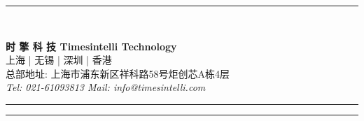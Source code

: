\makeatletter
{}



\renewcommand{\headrulewidth}{0pt}

{\color{myblue}\rule{30pt}{2.1cm}}
    \hspace{0.2cm}
    \begin{minipage}[b]{16.5cm}
    {\fontsize{36pt}{48pt}\textbf{\Target}}\\

    {\fontsize{28pt}{18pt}\textbf{\color{mygrayy}\@title}}
    \end{minipage}

\vspace{30em}


\begin{center}
	    \textbf{时 擎 科 技 Timesintelli Technology}\\%
	    \textsf{上海 | 无锡 | 深圳 | 香港}\\%
	    \textmd{总部地址: 上海市浦东新区祥科路58号炬创芯A栋4层}\\%
	    \textit{Tel: 021-61093813 \quad Mail: info@timesintelli.com}\\%
\end{center}

\vspace{10em}

\begin{flushright}
 \setlength\parindent{8em}
    \begin{minipage}[b]{1.7cm}
    \sphinxlogo
    \end{minipage}
    \hspace{0.2cm}
    \rule{3pt}{1.7cm}
    \hspace{0.2cm}
    \begin{minipage}[b]{4cm}
       {\large{\ReleaseName}}\smallskip\newline
        {\large{\@author}}\smallskip\newline
         {\large{\@date}}\smallskip
    \end{minipage}
    {\color{myblue}\rule{30pt}{1.7cm}}
\end{flushright}


\restoregeometry
\makeatother
